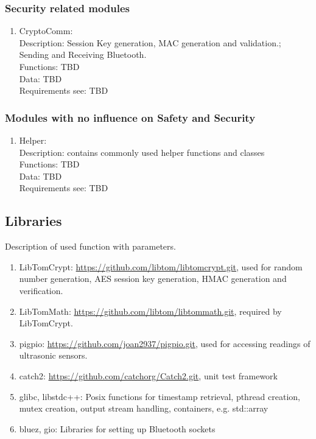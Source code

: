 \subsubsection{Security related modules}

\begin{enumerate}
	\item CryptoComm: \\
		Description: Session Key generation, MAC generation and validation.; Sending and Receiving Bluetooth.\\
		Functions: TBD\\
		Data: TBD\\
		Requirements see: TBD\\
\end{enumerate}

\subsubsection{Modules with no influence on Safety and Security}

\begin{enumerate}
	\item Helper: \\
		Description: contains commonly used helper functions and classes \\
		Functions: TBD\\
		Data: TBD\\
		Requirements see: TBD\\
\end{enumerate}

\subsection{Libraries}

Description of used function with parameters.

\begin{enumerate}
	\item LibTomCrypt: \href{https://github.com/libtom/libtomcrypt.git} {https://github.com/libtom/libtomcrypt.git}, used for random number generation, AES session key generation, HMAC generation and verification.
	\item LibTomMath: \href{https://github.com/libtom/libtommath.git} {https://github.com/libtom/libtommath.git}, required by LibTomCrypt.
	\item pigpio: \href{https://github.com/joan2937/pigpio.git} {https://github.com/joan2937/pigpio.git}, used for accessing readings of ultrasonic sensors.
	\item catch2: \href{https://github.com/catchorg/Catch2.git} {https://github.com/catchorg/Catch2.git}, unit test framework
	\item glibc, libstdc++: Posix functions for timestamp retrieval, pthread creation, mutex creation, output stream handling, containers, e.g. std::array
	\item bluez, gio: Libraries for setting up Bluetooth sockets
\end{enumerate}

